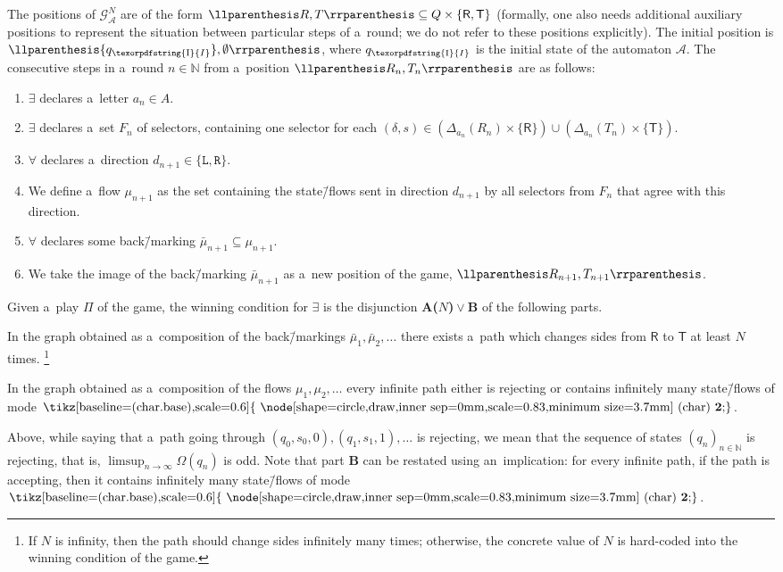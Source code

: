 \documentclass[11pt,a4paper]{amsart}
\theoremstyle{plain}
\theoremstyle{definition}
\theoremstyle{defC}
\theoremstyle{thmC}
\theoremstyle{plain}
\numberwithin{equation}{section}
\numberwithin{equation}{section}
\numberwithin{figure}{section}
\newcommand{\ident}[1]{\ensuremath{\texorpdfstring{\mathrm{\mathnm{#1}}}{#1}}\xspace}
\newcommand{\domain}[1]{\ensuremath{\mathbb{#1}}\xspace}
\newcommand{\N}{\domain{N}}
\newcommand{\mathcalsym}[1]{\ensuremath{\mathcal{#1}}\xspace}
\newcommand{\CA}{\mathcalsym{A}}
\newcommand{\CG}{\mathcalsym{G}}
\newcommand{\dL}{\mathtt{{\scriptstyle L}}}
\newcommand{\dR}{\mathtt{{\scriptstyle R}}}
\newcommand{\mathnm}[1]{#1}
\newcommand{\init}{\ident{I}}
\newcommand{\sT}{\mathsf{T}}
\newcommand{\sR}{\mathsf{R}}
\newcommand{\eve}{\ensuremath{\exists}\xspace}
\newcommand{\adam}{\ensuremath{\forall}\xspace}
\newcommand*\circled[1]{\tikz[baseline=(char.base),scale=0.6]{
            \node[shape=circle,draw,inner sep=0mm,scale=0.83,minimum size=3.7mm] (char) {\textbf{#1}};}}
\newcommand{\fb}{\mathbf{\text{\circled{2}}}}
\DeclarePairedDelimiter{\pair}{\llparenthesis}{\rrparenthesis}
\newcommand{\itemfont}[1]{\textbf{#1}}
\begin{document}
The positions of $\CG^N_\CA$ are of the form $\pair{R,T}\subseteq Q\times\{\sR,\sT\}$
(formally, one also needs additional auxiliary positions to represent the situation between particular steps of a~round; we do not refer to these positions explicitly).
The initial position is $\pair{\{q_\init\}, \emptyset}$, where $q_\init$ is the initial state of the automaton $\CA$.
The consecutive steps in a~round $n\in\N$ from a~position $\pair{R_n,T_n}$ are as follows:
\begin{enumerate}
\item \label{st:G-letter}	$\eve$ declares a~letter $a_n\in A$.
\item \label{st:G-selectors}	$\eve$ declares a~set $F_n$ of selectors, containing one selector for each $(\delta,s)\in(\Delta_{a_n}(R_n){\times}\{\sR\})\cup(\Delta_{a_n}(T_n){\times}\{\sT\})$.
\item \label{st:G-direction}	$\adam$ declares a~direction $d_{n+1}\in\{\dL,\dR\}$.
\item \label{st:G-flow}	We define a~flow $\mu_{n+1}$ as the set containing the state\=/flows sent in direction $d_{n+1}$ by all selectors from $F_n$ that agree with this direction.\label{it:step-flow}
\item \label{st:G-backmarking}	$\adam$ declares some back\=/marking $\bar\mu_{n+1}\subseteq\mu_{n+1}$.
\item \label{st:G-image}	We take the image of the back\=/marking $\bar\mu_{n+1}$ as a~new position of the game, $\pair{R_{n+1},T_{n+1}}$.
\end{enumerate}
\noindent %
Given a~play $\Pi$ of the game, the winning condition for $\eve$ is the disjunction \itemfont{A($N$)}${}\lor{}$\itemfont{B} of the following parts.
\begin{description}[leftmargin=4em]
\item[A($N$)] In the graph obtained as a~composition of the back\=/markings $\bar\mu_1,\bar\mu_2,\dots$ there exists a~path which changes sides from $\sR$ to $\sT$ at least $N$ times.%
	\footnote{If $N$ is infinity, then the path should change sides infinitely many times; otherwise, the concrete value of $N$ is hard-coded into the winning condition of the game.}
\item[B] In the graph obtained as a~composition of the flows $\mu_1,\mu_2,\dots$ every infinite path either is rejecting or contains infinitely many state\=/flows of mode $\fb$.
\end{description}
\noindent %
Above, while saying that a~path going through $(q_0,s_0,0),(q_1,s_1,1),\dots$ is rejecting, we mean that the sequence of states $(q_n)_{n\in\N}$ is rejecting, that is, $\limsup_{n\to\infty}\Omega(q_n)$ is odd.
Note that part \itemfont{B} can be restated using an~implication: for every infinite path, if the path is accepting, then it contains infinitely many state\=/flows of mode $\fb$.
\end{document}
